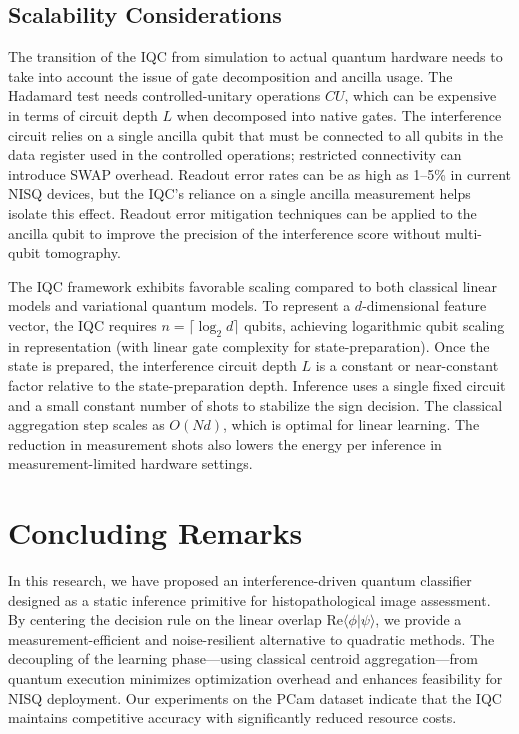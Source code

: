 \documentclass[conference]{IEEEtran}
\begin{document}
\subsection{Scalability Considerations}
The transition of the IQC from simulation to actual quantum hardware needs to take into account the issue of gate decomposition and ancilla usage. The Hadamard test needs controlled-unitary operations $CU$, which can be expensive in terms of circuit depth $L$ when decomposed into native gates. The interference circuit relies on a single ancilla qubit that must be connected to all qubits in the data register used in the controlled operations; restricted connectivity can introduce SWAP overhead. Readout error rates can be as high as 1--5\% in current NISQ devices, but the IQC's reliance on a single ancilla measurement helps isolate this effect. Readout error mitigation techniques can be applied to the ancilla qubit to improve the precision of the interference score without multi-qubit tomography.

The IQC framework exhibits favorable scaling compared to both classical linear models and variational quantum models. To represent a $d$-dimensional feature vector, the IQC requires $n = \lceil \log_2 d \rceil$ qubits, achieving logarithmic qubit scaling in representation (with linear gate complexity for state-preparation). Once the state is prepared, the interference circuit depth $L$ is a constant or near-constant factor relative to the state-preparation depth. Inference uses a single fixed circuit and a small constant number of shots to stabilize the sign decision. The classical aggregation step scales as $O(Nd)$, which is optimal for linear learning. The reduction in measurement shots also lowers the energy per inference in measurement-limited hardware settings.

\section{Concluding Remarks}
In this research, we have proposed an interference-driven quantum classifier designed as a static inference primitive for histopathological image assessment. By centering the decision rule on the linear overlap $\mathrm{Re}\langle \phi | \psi \rangle$, we provide a measurement-efficient and noise-resilient alternative to quadratic methods. The decoupling of the learning phase—using classical centroid aggregation—from quantum execution minimizes optimization overhead and enhances feasibility for NISQ deployment. Our experiments on the PCam dataset indicate that the IQC maintains competitive accuracy with significantly reduced resource costs.
\end{document}
